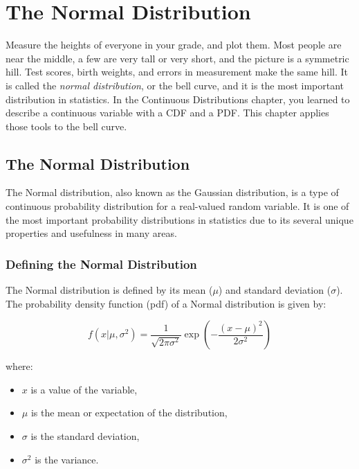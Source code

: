 \chapter{The Normal Distribution}

Measure the heights of everyone in your grade, and plot them. Most people are near the middle, a few are very
tall or very short, and the picture is a symmetric hill. Test scores, birth weights, and errors in
measurement make the same hill. It is called the \emph{normal distribution}, or the bell curve, and it is the
most important distribution in statistics. In the Continuous Distributions chapter, you learned to describe a
continuous variable with a CDF and a PDF. This chapter applies those tools to the bell curve.

\section{The Normal Distribution}
The Normal distribution, also known as the Gaussian distribution, is a
type of continuous probability distribution for a real-valued random
variable. It is one of the most important probability distributions in
statistics due to its several unique properties and usefulness in many
areas.

\subsection{Defining the Normal Distribution}

The Normal distribution is defined by its mean ($\mu$) and standard
deviation ($\sigma$). The probability density function (pdf) of a
Normal distribution is given by:

\begin{equation*}
f(x|\mu, \sigma^2) = \frac{1}{\sqrt{2\pi\sigma^2}} \exp\left(-\frac{(x-\mu)^2}{2\sigma^2}\right)
\end{equation*}

where:
\begin{itemize}
\item $x$ is a value of the variable,
\item $\mu$ is the mean or expectation of the distribution,
\item $\sigma$ is the standard deviation,
\item $\sigma^2$ is the variance.
\end{itemize}

